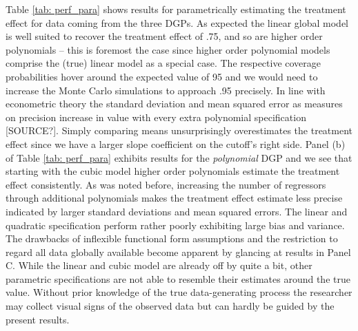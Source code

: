 Table \ref{tab: perf_para} shows results for parametrically estimating the treatment effect for data coming from the three DGPs. As expected the linear global model is well suited to recover the treatment effect of .75, and so are higher order polynomials -- this is foremost the case since higher order polynomial models comprise the (true) linear model as a special case. The respective coverage probabilities hover around the expected value of 95 and we would need to increase the Monte Carlo simulations to approach .95 precisely. In line with econometric theory the standard deviation and mean squared error as measures on precision increase in value with every extra polynomial specification [SOURCE?]. Simply comparing means unsurprisingly overestimates the treatment effect since we have a larger slope coefficient on the cutoff's right side. Panel (b) of Table \ref{tab: perf_para} exhibits results for the \textit{polynomial} DGP and we see that starting with the cubic model higher order polynomials estimate the treatment effect consistently. As was noted before, increasing the number of regressors through additional polynomials makes the treatment effect estimate less precise indicated by larger standard deviations and mean squared errors. The linear and quadratic specification perform rather poorly exhibiting large bias and variance. The drawbacks of inflexible functional form assumptions and the restriction to regard all data globally available become apparent by glancing at results in Panel C. While the linear and cubic model are already off by quite a bit, other parametric specifications are not able to resemble their estimates around the true value. Without prior knowledge of the true data-generating process the researcher may collect visual signs of the observed data but can hardly be guided by the present results.

